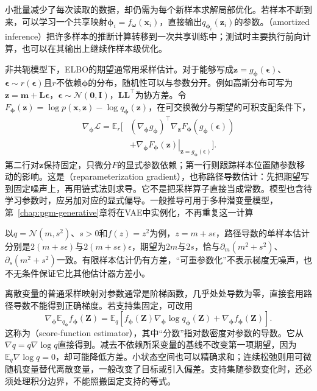 小批量减少了每次读取的数据，却仍需为每个新样本求解局部优化。若样本不断到来，可以学习一个共享映射$\bm{\phi}_i=f_{\bm{\omega}}(\bm x_i)$，直接输出$q_{\bm{\phi}_i}(\bm z_i)$的参数。（amortized inference）把许多样本的推断计算转移到一次共享训练中；测试时主要执行前向计算，也可以在其输出上继续作样本级优化。

非共轭模型下，ELBO的期望通常用采样估计。对于能够写成$\bm z=g_{\bm{\phi}}(\bm\epsilon)$、$\bm\epsilon\sim r(\bm\epsilon)$且$r$不依赖$\bm{\phi}$的分布，随机性可以与参数分开。例如高斯分布可写为$\bm z=\bm m+\bm L\bm\epsilon$，$\bm\epsilon\sim\mathcal N(\bm0,\bm I)$，$\bm L\bm L^\top$为协方差。令$F_{\bm{\phi}}(\bm z)=\log p(\bm x,\bm z)-\log q_{\bm{\phi}}(\bm z)$，在可交换微分与期望的可积支配条件下，
\begin{equation}
  \begin{aligned}
    \nabla_{\bm{\phi}}\mathcal L
      =\mathbb E_r\big[
        &(\nabla_{\bm{\phi}}g_{\bm{\phi}})^\top
           \nabla_{\bm z}F_{\bm{\phi}}
                (g_{\bm{\phi}}(\bm\epsilon))\\
        &+\left.\nabla_{\bm{\phi}}F_{\bm{\phi}}(\bm z)
          \right|_{\bm z=g_{\bm{\phi}}(\bm\epsilon)}
        \big].
  \end{aligned}
  \label{eq:pgm-variational-pathwise}
\end{equation}
第二行对$\bm z$保持固定，只微分$F$的显式参数依赖；第一行则跟踪样本位置随参数移动的影响。这是（reparameterization gradient），也称路径导数估计：先把期望写到固定噪声上，再用链式法则求导。它不是把采样算子直接当成常数。模型也含待学习参数时，应另加对应的显式偏导。一般推导可用于多种潜变量模型，第~\ref{chap:pgm-generative}章将在VAE中实例化，不再重复这一计算

以$q=\mathcal N(m,s^2)$、$s>0$和$f(z)=z^2$为例，$z=m+s\epsilon$，路径导数的单样本估计分别是$2(m+s\epsilon)$与$2(m+s\epsilon)\epsilon$，期望为$2m$与$2s$，恰与$\partial_m(m^2+s^2)$、$\partial_s(m^2+s^2)$一致。有限样本估计仍有方差，“可重参数化”不表示梯度无噪声，也不无条件保证它比其他估计器方差小。

离散变量的普通采样映射对参数通常是阶梯函数，几乎处处导数为零，直接套用路径导数不能得到正确梯度。若支持集固定，可改用
\begin{equation}
  \nabla_{\bm{\phi}}\mathbb E_{q_{\bm{\phi}}}f_{\bm{\phi}}(\bm Z)
    =\mathbb E_q\!\left[
       f_{\bm{\phi}}(\bm Z)\nabla_{\bm{\phi}}\log q_{\bm{\phi}}(\bm Z)
       +\nabla_{\bm{\phi}}f_{\bm{\phi}}(\bm Z)\right].
  \label{eq:pgm-variational-score-function}
\end{equation}
这称为（score-function estimator），其中“分数”指对数密度对参数的导数。它从$\nabla q=q\nabla\log q$直接得到。减去不依赖所采变量的基线不改变第一项期望，因为$\mathbb E_q\nabla\log q=0$，却可能降低方差。小状态空间也可以精确求和；连续松弛则用可微随机变量替代离散变量，一般改变了目标或引入偏差。支持集随参数变化时，还必须处理积分边界，不能照搬固定支持的等式。

